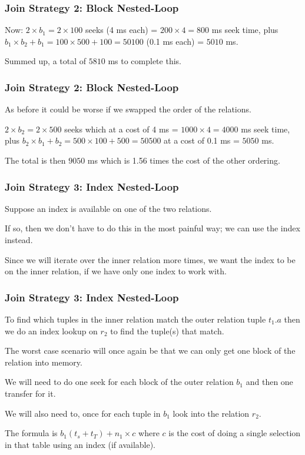 \begin{frame}
\frametitle{Join Strategy 2: Block Nested-Loop}

Now: $2 \times b_{1} = 2 \times 100 $ seeks (4 ms each) = $200 \times 4 = 800$ ms seek time, plus $b_{1} \times b_{2} + b_{1} = 100 \times 500 + 100 = 50100$ (0.1 ms each) = $5010$ ms. 

Summed up, a total of $5810$ ms to complete this.

\end{frame}

\begin{frame}
\frametitle{Join Strategy 2: Block Nested-Loop}

As before it could be worse if we swapped the order of the relations. 

$2 \times b_{2} = 2 \times 500 $ seeks which at a cost of 4 ms = $1000 \times 4 = 4000$ ms seek time, plus $b_{2} \times b_{1} + b_{2} = 500 \times 100 + 500 = 50500$ at a cost of 0.1 ms = $5050$ ms. 

The total is then $9050$ ms which is 1.56 times the cost of the other ordering.

\end{frame}

\begin{frame}
\frametitle{Join Strategy 3: Index Nested-Loop}

Suppose an index is available on one of the two relations. 

If so, then we don't have to do this in the most painful way; we can use the index instead.

 Since we will iterate over the inner relation more times, we want the index to be on the inner relation, if we have only one index to work with.

\end{frame}

\begin{frame}
\frametitle{Join Strategy 3: Index Nested-Loop}

To find which tuples in the inner relation match the outer relation tuple $t_{1}.a$ then we do an index lookup on $r_{2}$ to find the tuple(s) that match. 

The worst case scenario will once again be that we can only get one block of the relation into memory. 

We will need to do one seek for each block of the outer relation $b_{1}$ and then one transfer for it. 

We will also need to, once for each tuple in $b_{1}$ look into the relation $r_{2}$. 

The formula is $b_{1} ( t_{s} + t_{T} ) + n_{1} \times c$  where $c$ is the cost of doing a single selection in that table using an index (if available).

\end{frame}

